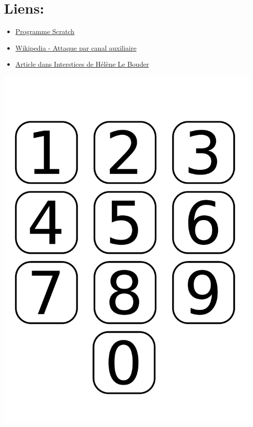 \documentclass[a4paper]{article}
\begin{document}

\section{Liens:}
\begin{itemize}
\item \href{https://scratch.mit.edu/projects/228338538/#player}{Programme Scratch}
\item \href{https://fr.wikipedia.org/wiki/Attaque_par_canal_auxiliaire}{Wikipedia - Attaque par canal auxiliaire}
\item \href{https://interstices.info/jcms/p_91127/des-attaques-informatiques-utilisant-la-physique}{Article dans Interstices de Hélène Le Bouder}
\end{itemize}

%
%

\newpage
\includegraphics[width=\textwidth]{digicode.pdf}
\end{document}
